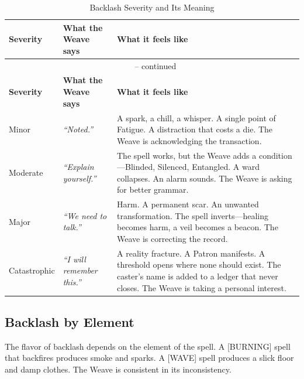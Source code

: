 \begin{longtable}{p{} p{} p{}}
\caption{Backlash Severity and Its Meaning}\\
\midrule
\textbf{Severity} & \textbf{What the Weave says} & \textbf{What it feels like}\\
\midrule
\endfirsthead
\multicolumn{3}{c}{\tablename\ \thetable{} -- continued}\\
\midrule
\textbf{Severity} & \textbf{What the Weave says} & \textbf{What it feels like}\\
\midrule
\endhead
Minor & \emph{``Noted.''} & A spark, a chill, a whisper. A single point of Fatigue. A distraction that costs a die. The Weave is acknowledging the transaction. \\
Moderate & \emph{``Explain yourself.''} & The spell works, but the Weave adds a condition---Blinded, Silenced, Entangled. A ward collapses. An alarm sounds. The Weave is asking for better grammar. \\
Major & \emph{``We need to talk.''} & Harm. A permanent scar. An unwanted transformation. The spell inverts---healing becomes harm, a veil becomes a beacon. The Weave is correcting the record. \\
Catastrophic & \emph{``I will remember this.''} & A reality fracture. A Patron manifests. A threshold opens where none should exist. The caster's name is added to a ledger that never closes. The Weave is taking a personal interest. \\
\hline
\end{longtable}

\subsection{Backlash by Element}

The flavor of backlash depends on the element of the spell. A [BURNING] spell that backfires produces smoke and sparks. A [WAVE] spell produces a slick floor and damp clothes. The Weave is consistent in its inconsistency.


